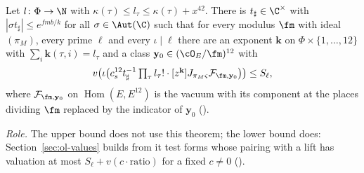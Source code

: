 \begin{theorem}
\label{der:thm:sharp}
Let $l\colon\Phi\to\N$ with $\kappa(\tau)\le l_\tau\le\kappa(\tau)+x^{42}$. There is
$t_\sharp\in\C^\times$ with $|\sigma t_\sharp|\le e^{fmb/k}$ for all $\sigma\in\Aut(\C)$ such that for
every modulus $\fm$ with ideal $(\pi_M)$, every prime $\ell$ and every $\iota\mid\ell$ there are an
exponent $\mathbf k$ on $\Phi\times\{1,\dots,12\}$ with $\sum_i\mathbf k(\tau,i)=l_\tau$ and a class
$\mathbf y_0\in(\cO_E/\fm)^{12}$ with
\[
v\bigl(\iota\bigl(c_s^{12}t_\sharp^{-1}\textstyle\prod_\tau l_\tau!\cdot[z^{\mathbf k}]
J_{\pi_M\varsigma}\mathcal F_{\fm,\mathbf y_0}\bigr)\bigr)\le S_\ell,
\]
where $\mathcal F_{\fm,\mathbf y_0}$ on $\operatorname{Hom}(E,E^{12})$ is the vacuum with its component
at the places dividing $\fm$ replaced by the indicator of $\mathbf y_0$ ().
\end{theorem}

\emph{Role.} The upper bound does not use this theorem; the lower bound does:
Section~\ref{sec:ol-values} builds from it test forms whose pairing with a lift has valuation at most
$S_\ell+v(c\cdot\mathrm{ratio})$ for a fixed $c\ne0$
().

